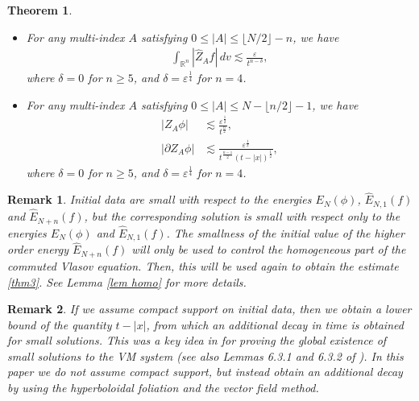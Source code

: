 \documentclass{article}
\newtheorem{theorem}{Theorem}[section]
\newtheorem{remark}{Remark}[section]
\newcommand{\bbr}{{\mathbb R}}
\begin{document}
\begin{theorem}
\begin{itemize}
where $ \delta = 0 $ for $ n \geq 5 $, and $ \delta = \varepsilon^{ \frac14 } $ for $ n = 4 $.
\item[5.] For any multi-index $ A $ satisfying $ 0 \leq | A | \leq \lfloor N / 2 \rfloor - n $, we have
\begin{align}
\int_{ \bbr^n } | \hat{ Z }_A f | \, d v \lesssim \frac{ \varepsilon }{ t^{ n - \delta } } , \label{thm5}
\end{align}
where $ \delta = 0 $ for $ n \geq 5 $, and $ \delta = \varepsilon^{ \frac14 } $ for $ n = 4 $.
\item[6.] For any multi-index $ A $ satisfying $ 0 \leq | A | \leq N - \lfloor n / 2 \rfloor - 1 $, we have
\begin{align}
| Z_A \phi | & \lesssim \frac{ \varepsilon^{ \frac12 } }{ t^{ \frac{ n }{ 2 } } } , \label{thm61} \\
| \partial Z_A \phi | & \lesssim \frac{ \varepsilon^{ \frac12 } }{ t^{ \frac{ n - 1 }{ 2 } } ( t - | x | )^{ \frac12 } } , \label{thm62}
\end{align}
where $ \delta = 0 $ for $ n \geq 5 $, and $ \delta = \varepsilon^{ \frac14 } $ for $ n = 4 $.
\end{itemize}
\end{theorem}

%
\begin{remark}
Initial data are small with respect to the energies $ E_N ( \phi ) $, $ \hat{ E }_{ N , 1 } ( f ) $ and $ \hat{ E }_{ N + n } ( f ) $, but the corresponding solution is small with respect only to the energies $ E_N ( \phi ) $ and $ \hat{ E }_{ N , 1 } ( f ) $. The smallness of the initial value of the higher order energy $ \hat{ E }_{ N + n } ( f ) $ will only be used to control the homogeneous part of the commuted Vlasov equation. Then, this will be used again to obtain the estimate \eqref{thm3}. See Lemma \ref{lem homo} for more details.
\end{remark}

%
\begin{remark}
If we assume compact support on initial data, then we obtain a lower bound of the quantity $ t - | x | $, from which an additional decay in time is obtained for small solutions. This was a key idea in \cite{GS87} for proving the global existence of small solutions to the VM system (see also Lemmas 6.3.1 and 6.3.2 of \cite{Gl}). In this paper we do not assume compact support, but instead obtain an additional decay by using the hyperboloidal foliation and the vector field method.
\end{remark}
\end{document}
